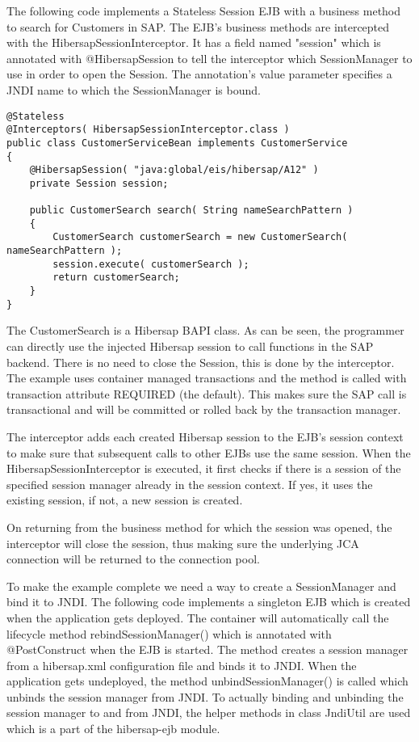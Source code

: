 The following code implements a Stateless Session EJB with a business method to search for Customers in SAP. The EJB's business methods are intercepted with the HibersapSessionInterceptor. It has a field named "session" which is annotated with @HibersapSession to tell the interceptor which SessionManager to use in order to open the Session. The annotation's value parameter specifies a JNDI name to which the SessionManager is bound.\\

\begin{lstlisting}
@Stateless
@Interceptors( HibersapSessionInterceptor.class )
public class CustomerServiceBean implements CustomerService
{
    @HibersapSession( "java:global/eis/hibersap/A12" )
    private Session session;

    public CustomerSearch search( String nameSearchPattern )
    {
        CustomerSearch customerSearch = new CustomerSearch( nameSearchPattern );
        session.execute( customerSearch );
        return customerSearch;
    }
}
\end{lstlisting}

The CustomerSearch is a Hibersap BAPI class. As can be seen, the programmer can directly use the injected Hibersap session to call functions in the SAP backend. There is no need to close the Session, this is done by the interceptor. The example uses container managed transactions and the method is called with transaction attribute REQUIRED (the default). This makes sure the SAP call is transactional and will be committed or rolled back by the transaction manager.

The interceptor adds each created Hibersap session to the EJB's session context to make sure that subsequent calls to other EJBs use the same session. When the HibersapSessionInterceptor is executed, it first checks if there is a session of the specified session manager already in the session context. If yes, it uses the existing session, if not, a new session is created.

On returning from the business method for which the session was opened, the interceptor will close the session, thus making sure the underlying JCA connection will be returned to the connection pool.

To make the example complete we need a way to create a SessionManager and bind it to JNDI. The following code implements a singleton EJB which is created when the application gets deployed. The container will automatically call the lifecycle method rebindSessionManager() which is annotated with @PostConstruct when the EJB is started. The method creates a session manager from a hibersap.xml configuration file and binds it to JNDI. When the application gets undeployed, the method unbindSessionManager() is called which unbinds the session manager from JNDI. To actually binding and unbinding the session manager to and from JNDI, the helper methods in class JndiUtil are used which is a part of the hibersap-ejb module. 

